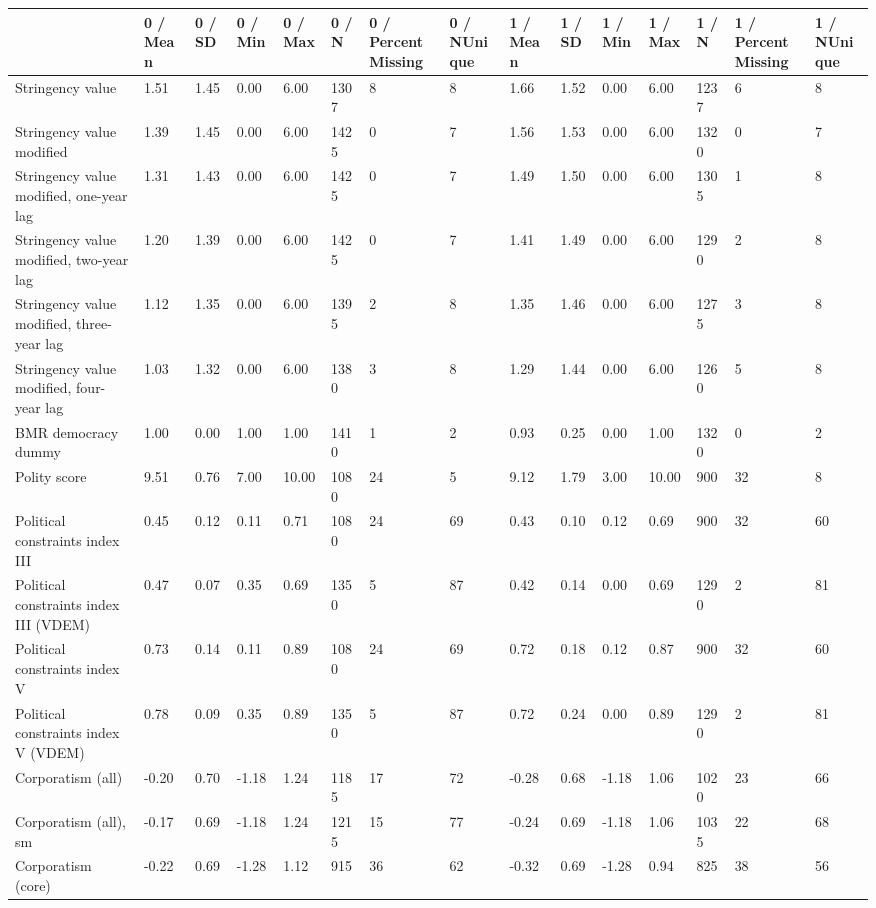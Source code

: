 
\begin{longtable}{lllllllllllllll}
\toprule
  & 0 / Mean & 0 / SD & 0 / Min & 0 / Max & 0 / N & 0 / PercentMissing & 0 / NUnique & 1 / Mean & 1 / SD & 1 / Min & 1 / Max & 1 / N & 1 / PercentMissing & 1 / NUnique\\
\midrule
Stringency value & 1.51 & 1.45 & 0.00 & 6.00 & 1307 & 8 & 8 & 1.66 & 1.52 & 0.00 & 6.00 & 1237 & 6 & 8\\
Stringency value modified & 1.39 & 1.45 & 0.00 & 6.00 & 1425 & 0 & 7 & 1.56 & 1.53 & 0.00 & 6.00 & 1320 & 0 & 7\\
Stringency value modified, one-year lag & 1.31 & 1.43 & 0.00 & 6.00 & 1425 & 0 & 7 & 1.49 & 1.50 & 0.00 & 6.00 & 1305 & 1 & 8\\
Stringency value modified, two-year lag & 1.20 & 1.39 & 0.00 & 6.00 & 1425 & 0 & 7 & 1.41 & 1.49 & 0.00 & 6.00 & 1290 & 2 & 8\\
Stringency value modified, three-year lag & 1.12 & 1.35 & 0.00 & 6.00 & 1395 & 2 & 8 & 1.35 & 1.46 & 0.00 & 6.00 & 1275 & 3 & 8\\
\addlinespace
Stringency value modified, four-year lag & 1.03 & 1.32 & 0.00 & 6.00 & 1380 & 3 & 8 & 1.29 & 1.44 & 0.00 & 6.00 & 1260 & 5 & 8\\
BMR democracy dummy & 1.00 & 0.00 & 1.00 & 1.00 & 1410 & 1 & 2 & 0.93 & 0.25 & 0.00 & 1.00 & 1320 & 0 & 2\\
Polity score & 9.51 & 0.76 & 7.00 & 10.00 & 1080 & 24 & 5 & 9.12 & 1.79 & 3.00 & 10.00 & 900 & 32 & 8\\
Political constraints index III & 0.45 & 0.12 & 0.11 & 0.71 & 1080 & 24 & 69 & 0.43 & 0.10 & 0.12 & 0.69 & 900 & 32 & 60\\
Political constraints index III (VDEM) & 0.47 & 0.07 & 0.35 & 0.69 & 1350 & 5 & 87 & 0.42 & 0.14 & 0.00 & 0.69 & 1290 & 2 & 81\\
\addlinespace
Political constraints index V & 0.73 & 0.14 & 0.11 & 0.89 & 1080 & 24 & 69 & 0.72 & 0.18 & 0.12 & 0.87 & 900 & 32 & 60\\
Political constraints index V (VDEM) & 0.78 & 0.09 & 0.35 & 0.89 & 1350 & 5 & 87 & 0.72 & 0.24 & 0.00 & 0.89 & 1290 & 2 & 81\\
Corporatism (all) & -0.20 & 0.70 & -1.18 & 1.24 & 1185 & 17 & 72 & -0.28 & 0.68 & -1.18 & 1.06 & 1020 & 23 & 66\\
Corporatism (all), sm & -0.17 & 0.69 & -1.18 & 1.24 & 1215 & 15 & 77 & -0.24 & 0.69 & -1.18 & 1.06 & 1035 & 22 & 68\\
Corporatism (core) & -0.22 & 0.69 & -1.28 & 1.12 & 915 & 36 & 62 & -0.32 & 0.69 & -1.28 & 0.94 & 825 & 38 & 56\\

\end{longtable}
